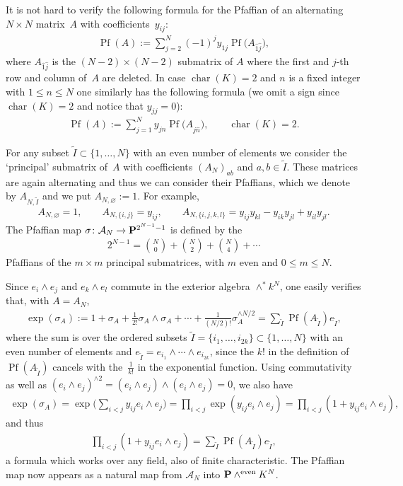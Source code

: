 \documentclass[10pt,a4paper]{amsart}
\newcommand{\PP}{{\bf P}}
\newcommand{\cA}{{\cal A}}
\newcommand{\tI}{{\tilde{I}}}
\numberwithin{equation}{section}
\providecommand{\cal}{\mathcal}
\begin{document}
It is not hard to verify the following formula for the Pfaffian of an alternating $N\times N$ mat\-rix~$A$ with coefficients~$y_{ij}$:
\begin{gather*}
\operatorname{Pf}(A) := \sum_{j=2}^N (-1)^jy_{1j}\operatorname{Pf}\big(A_{\hat{1}\hat{j}}\big),
\end{gather*}
where $A_{\hat{1}\hat{j}}$ is the $(N-2)\times(N-2)$ submatrix of $A$ where the first and $j$-th row and column of~$A$ are deleted. In case $\operatorname{char}(K)=2$ and $n$ is a fixed integer with $1\leq n\leq N$ one similarly has the following formula (we omit a sign since $\operatorname{char}(K)=2$ and notice that $y_{jj}=0$):
\begin{gather*}
\operatorname{Pf}(A) := \sum_{j=1}^N y_{jn}\operatorname{Pf}\big(A_{\hat{j}\hat{n}}\big),\qquad \operatorname{char}(K)=2.
\end{gather*}

For any subset $\tI\subset \{1,\ldots,N\}$ with an even number of elements we consider the `principal' submatrix of~$A$ with coefficients $(A_N)_{ab}$ and $a,b\in \tI$. These matrices are again alternating and thus we can consider their Pfaffians, which we denote by $A_{N,\tI}$ and we put $A_{N,\varnothing}:=1$. For example,
\begin{gather*}
A_{N,\varnothing}=1,\qquad A_{N,\{i,j\}}=y_{ij},\qquad A_{N,\{i,j,k,l\}}=y_{ij}y_{kl} - y_{ik}y_{jl} + y_{il}y_{jl}.
\end{gather*}
The Pfaffian map $\sigma\colon \cA_N\rightarrow \PP^{2^{N-1}-1}$ is defined by the
\begin{gather*}
2^{N-1} = \binom{N}{0} + \binom{N}{2} + \binom{N}{4} + \cdots
\end{gather*}
Pfaffians of the $m\times m$ principal submatrices, with $m$ even and $0\leq m\leq N$.

Since $e_i\wedge e_j$ and $e_k\wedge e_l$ commute in the exterior algebra $\wedge^*k^N$, one easily verifies that, with $A=A_N$,
\begin{gather*}
\exp(\sigma_A) := 1+\sigma_A+ \frac{1}{2!} \sigma_A\wedge \sigma_A+ \cdots + \frac{1}{(N/2)!}\sigma_A^{\wedge N/2} = \sum_\tI \operatorname{Pf}(A_\tI)e_\tI,
\end{gather*}
where the sum is over the ordered subsets $\tI=\{i_1,\ldots,i_{2k}\}\subset\{1,\ldots,N\}$ with an even number of elements and $e_\tI=e_{i_1}\wedge\cdots\wedge e_{i_{2k}}$,
since the $k!$ in the definition of $\operatorname{Pf}(A_\tI)$ cancels with the~$\frac{1}{k!}$ in the exponential function. Using commutativity as well as $(e_i\wedge e_j)^{\wedge 2} =(e_i\wedge e_j)\wedge(e_i\wedge e_j)=0$, we also have
\begin{gather*}
\exp(\sigma_A) = \exp\bigg(\sum_{i<j} y_{ij}e_i\wedge e_j\bigg) = \prod_{i<j}\exp(y_{ij}e_i\wedge e_j) =\prod_{i<j}(1+y_{ij}e_i\wedge e_j),
\end{gather*}
and thus
\begin{gather*}
\prod_{i<j}(1+y_{ij}e_i\wedge e_j) = \sum_\tI \operatorname{Pf}(A_\tI)e_\tI,
\end{gather*}
a formula which works over any field, also of finite characteristic. The Pfaffian map now appears as a natural map from $\cA_N$ into $\PP \wedge^{{\rm even}}K^N$.
\end{document}
